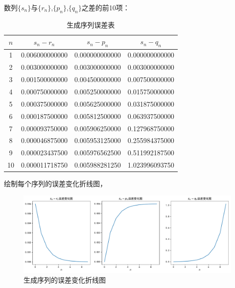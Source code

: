 数列$\{s_n\}$与$\{r_n\}$,$\{p_n\}$,$\{q_n\}$之差的前10项：

\begin{table}[H]
	\centering
	\caption{生成序列误差表}
	\begin{tabular}{clll}
		\hline
		$n$ & \multicolumn{1}{c}{$s_n - r_n$} & \multicolumn{1}{c}{$s_n - p_n$} & \multicolumn{1}{c}{$s_n - q_n$} \\ \hline
		1   & 0.006000000000            & 0.000000000000            & 0.000000000000            \\
		2   & 0.003000000000            & 0.003000000000            & 0.003000000000            \\
		3   & 0.001500000000            & 0.004500000000            & 0.007500000000            \\
		4   & 0.000750000000            & 0.005250000000            & 0.015750000000            \\
		5   & 0.000375000000            & 0.005625000000            & 0.031875000000            \\
		6   & 0.000187500000            & 0.005812500000            & 0.063937500000            \\
		7   & 0.000093750000            & 0.005906250000            & 0.127968750000            \\
		8   & 0.000046875000            & 0.005953125000            & 0.255984375000            \\
		9   & 0.000023437500            & 0.005976562500            & 0.511992187500            \\
		10  & 0.000011718750            & 0.005988281250            & 1.023996093750            \\ \hline
	\end{tabular}
\end{table}

绘制每个序列的误差变化折线图，

\begin{figure}[H]
	\centering
	\caption{生成序列的误差变化折线图}
	\includegraphics[width=\linewidth]{fig2.pdf}
\end{figure}

